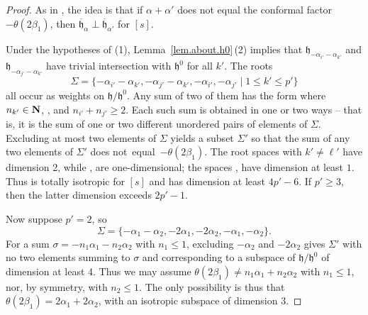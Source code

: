 \documentclass[pdftex]{sigma}
\numberwithin{equation}{section}
\theoremstyle{definition}
\def\N{{\bf N}}
\newcommand{\lieh}{\mathfrak{h}}
\begin{document}
\begin{proof}
As in \cite[Observation 3]{pecastaing.rank1}, the idea is that if $\alpha + \alpha'$ does not equal the conformal factor~$- \theta(2 \beta_1)$, then $\overline{\lieh}_\alpha \perp \overline{\lieh}_{\alpha'}$ for $[s]$.

Under the hypotheses of (1), Lemma~\ref{lem.about.h0}\,(2) implies that ${\lieh}_{- \alpha_{i'} - \alpha_{k'}}$ and ${\lieh}_{- \alpha_{j'} - \alpha_{k'}}$ have trivial intersection with $\lieh^0$ for all $k'$. The roots
\[
\Sigma = \{ - \alpha_{i'} - \alpha_{k'}, - \alpha_{j'} - \alpha_{k'}, - \alpha_{i'}, - \alpha_{j'} \mid 1 \leq k' \leq p' \}
\]
all occur as weights on $\lieh/\lieh^0$. Any sum of two of them has the form  where $n_{k'} \in \N$, , and $n_{i'} + n_{j'} \geq 2$.
Each such sum is obtained in one or two ways -- that is, it is the sum of one or two different unordered pairs of elements of $\Sigma$. Excluding at most two elements of $\Sigma$ yields a subset $\Sigma'$ so that the sum of any two elements of $\Sigma'$ does not~equal~$- \theta(2 \beta_1)$. The root spaces \smash{$\lieh_{- \alpha_{k'} - \alpha_{\ell'}}$} with $k' \neq \ell'$ have dimension 2, while \smash{$\lieh_{- 2 \alpha_{i'}}$}, \smash{$\lieh_{- 2 \alpha_{j'}}$} are one-dimensional; the spaces \smash{$\overline{\lieh}_{- \alpha_{i'}}$}, \smash{$\overline{\lieh}_{- \alpha_{j'}}$} have dimension at least $1$. Thus \smash{$\bigoplus_{\sigma \in \Sigma'} \overline{\lieh}_\sigma$} is totally isotropic for $[s]$ and has dimension at least $4p'-6$. If $p' \geq 3$, then the latter dimension exceeds $2p'-1$.

Now suppose $p'=2$, so
\[\Sigma = \{ -\alpha_1 - \alpha_2, - 2 \alpha_1, - 2 \alpha_2, - \alpha_1, - \alpha_2 \}.\]
For a sum $\sigma = - n_1 \alpha_1 - n_2 \alpha_2$ with $n_1 \leq 1$, excluding $- \alpha_2$ and $- 2 \alpha_2$ gives $\Sigma'$ with no two elements summing to $\sigma$ and corresponding to a subspace of $\lieh/\lieh^0$ of dimension at least 4. Thus we may assume $ \theta(2 \beta_1) \neq n_1 \alpha_1 + n_2 \alpha_2$ with $n_1 \leq 1$, nor, by symmetry, with $n_2 \leq 1$. The only possibility is thus that $\theta(2 \beta_1) = 2 \alpha_1 + 2 \alpha_2$, with an isotropic subspace of dimension 3.


\end{proof}
\end{document}

